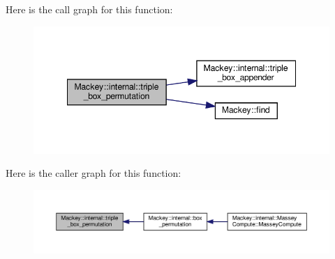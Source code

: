 Here is the call graph for this function\+:\nopagebreak
\begin{figure}[H]
\begin{center}
\leavevmode
\includegraphics[width=348pt]{namespaceMackey_1_1internal_a2647c2357084142a1647364848db3205_cgraph}
\end{center}
\end{figure}
Here is the caller graph for this function\+:\nopagebreak
\begin{figure}[H]
\begin{center}
\leavevmode
\includegraphics[width=350pt]{namespaceMackey_1_1internal_a2647c2357084142a1647364848db3205_icgraph}
\end{center}
\end{figure}
